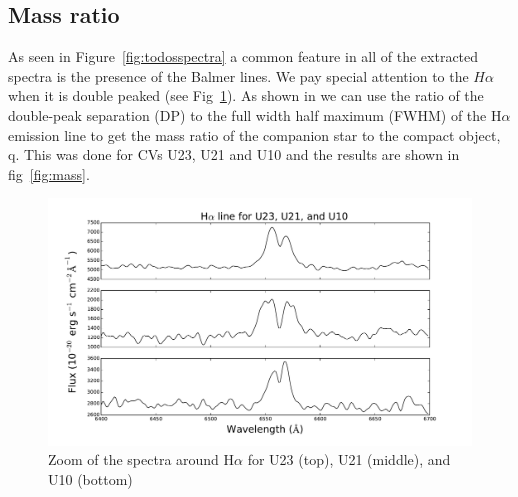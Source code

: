 \subsection{Mass ratio}

As seen in Figure~\ref{fig:todosspectra} a common feature in all of the extracted spectra is the presence of the Balmer lines. We pay special attention to the $H\alpha$ when it is double peaked (see Fig~\ref{fig:halphatodos}). As shown in \cite{casares_massration_20016} we can use the ratio of the double-peak separation (DP) to the full width half maximum (FWHM) of the H$\alpha$ emission line to get the mass ratio of the companion star to the compact object, q. This was done for CVs U23, U21 and U10 and the results are shown in fig~\ref{fig:mass}.

\begin{figure}[h]
        \centering
        \includegraphics[scale=.5]{assets/images/todos.pdf}
\caption{Zoom of the spectra around H$\alpha$ for U23 (top), U21 (middle), and U10 (bottom)}
\label{fig:halphatodos}
\end{figure}

